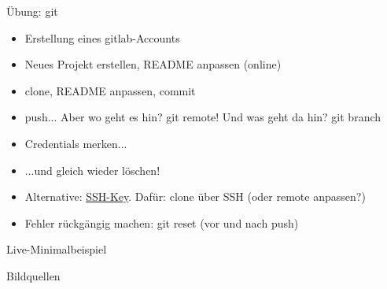 \documentclass[aspectratio=169,t]{beamer}
\begin{document}
\begin{frame}{Übung: git}
    \begin{itemize}
        \item Erstellung eines gitlab-Accounts
        \item<2-> Neues Projekt erstellen, README anpassen (online)
        \item<3-> clone, README anpassen, commit
        \item<4-> push... Aber wo geht es hin? git remote! Und was geht da hin? git branch
        \item<5-> Credentials merken...
        \item<6-> ...und gleich wieder löschen! 
        \item<7-> Alternative: \href{https://docs.gitlab.com/ee/ssh/}{SSH-Key}. Dafür: clone über SSH (oder remote anpassen?)
        \item<8-> Fehler rückgängig machen: git reset (vor und nach push)
    \end{itemize}
\end{frame}

\begin{frame}{Live-Minimalbeispiel}
\end{frame}


\begin{frame}{Bildquellen}
\printbibliography
\end{frame}
\end{document}
